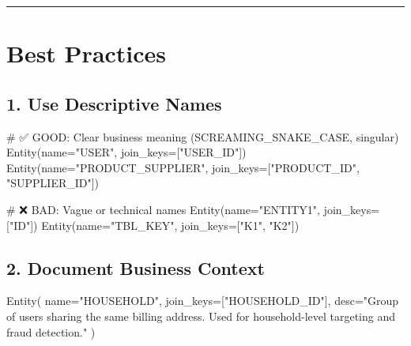 \documentclass[
  letterpaper,
  DIV=11,
  numbers=noendperiod]{scrreprt}
\newenvironment{Shaded}{\begin{snugshade}}{\end{snugshade}}
\newcommand{\CommentTok}[1]{\textcolor[rgb]{0.37,0.37,0.37}{#1}}
\newcommand{\NormalTok}[1]{\textcolor[rgb]{0.00,0.23,0.31}{#1}}
\newcommand{\OperatorTok}[1]{\textcolor[rgb]{0.37,0.37,0.37}{#1}}
\newcommand{\StringTok}[1]{\textcolor[rgb]{0.13,0.47,0.30}{#1}}
\begin{document}
\begin{center}\rule{0.5\linewidth}{0.5pt}\end{center}

\hypertarget{best-practices-1}{%
\section{Best Practices}\label{best-practices-1}}

\hypertarget{use-descriptive-names}{%
\subsection{1. Use Descriptive Names}\label{use-descriptive-names}}

\begin{Shaded}
\begin{Highlighting}[]
\CommentTok{\# ✅ GOOD: Clear business meaning (SCREAMING\_SNAKE\_CASE, singular)}
\NormalTok{Entity(name}\OperatorTok{=}\StringTok{"USER"}\NormalTok{, join\_keys}\OperatorTok{=}\NormalTok{[}\StringTok{"USER\_ID"}\NormalTok{])}
\NormalTok{Entity(name}\OperatorTok{=}\StringTok{"PRODUCT\_SUPPLIER"}\NormalTok{, join\_keys}\OperatorTok{=}\NormalTok{[}\StringTok{"PRODUCT\_ID"}\NormalTok{, }\StringTok{"SUPPLIER\_ID"}\NormalTok{])}

\CommentTok{\# ❌ BAD: Vague or technical names}
\NormalTok{Entity(name}\OperatorTok{=}\StringTok{"ENTITY1"}\NormalTok{, join\_keys}\OperatorTok{=}\NormalTok{[}\StringTok{"ID"}\NormalTok{])}
\NormalTok{Entity(name}\OperatorTok{=}\StringTok{"TBL\_KEY"}\NormalTok{, join\_keys}\OperatorTok{=}\NormalTok{[}\StringTok{"K1"}\NormalTok{, }\StringTok{"K2"}\NormalTok{])}
\end{Highlighting}
\end{Shaded}

\hypertarget{document-business-context}{%
\subsection{2. Document Business
Context}\label{document-business-context}}

\begin{Shaded}
\begin{Highlighting}[]
\NormalTok{Entity(}
\NormalTok{    name}\OperatorTok{=}\StringTok{"HOUSEHOLD"}\NormalTok{,}
\NormalTok{    join\_keys}\OperatorTok{=}\NormalTok{[}\StringTok{"HOUSEHOLD\_ID"}\NormalTok{],}
\NormalTok{    desc}\OperatorTok{=}\StringTok{"Group of users sharing the same billing address. Used for household{-}level targeting and fraud detection."}
\NormalTok{)}
\end{Highlighting}
\end{Shaded}
\end{document}
